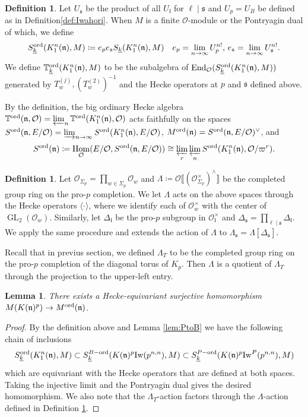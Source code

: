 \documentclass[leqno]{amsart}
\newtheorem{lem}[thm]{Lemma}
\theoremstyle{definition}
\newtheorem{defn}[thm]{Definition}
\theoremstyle{remark}
\newcommand{\oo}{\mathcal{O}}
\DeclareMathOperator{\End}{End}
\DeclareMathOperator{\Hom}{Hom}
\DeclareMathOperator{\GL}{GL}
\newcommand{\fs}{\mathfrak{s}}
\newcommand{\fn}{\mathfrak{n}}
\newcommand{\fl}{\mathfrak{l}}
\newcommand{\wt}[1]{\underline{ #1 }}
\newcommand{\Iw}{\textnormal{Iw}} %
\newcommand{\TT}{\mathbb{T}} %
\newcommand{\ord}{\textnormal{ord}} %
\begin{document}
\begin{defn}\label{def:ord_space_auxlevel}
Let $U_\fs$ be the product of all $  U_{\fl}$
for $\ell\mid \fs$ and $U_p=U_B$ be defined 
as in Definition\ref{def:Iwahori}.
When $M$ is a finite  $\oo$-module or the 
Pontryagin dual of which,
we define 
\[
	S_{\wt{k}}^{\ord}(K^n_1(\fn),M)\coloneqq
	e_pe_{\fs} S_{\wt{k}}(K^n_1(\fn),M)\quad
	e_p=\lim_{n\to \infty}U_p^{n!},\,
	e_\fs=\lim_{n\to \infty}U_\fs^{n!}.
\]
We define $\TT^{\ord}_{\wt{k}}(K^n_1(\fn),M)$
to be the subalgebra of 
$\End_{\oo}(S_{\wt{k}}^{\ord}(K^n_1(\fn),M))$
generated by $T_w^{(j)}, (T_{w}^{(2)})^{-1}$
and the Hecke operators at $p$ and  $\fs$ defined above.
\end{defn}
By the definition,
the big ordinary Hecke algebra
$\TT^{\ord}(\fn,\oo)=\varprojlim_n
\TT^{\ord}(K^n_1(\fn),\oo)$
acts faithfully on the spaces
$S^{\ord}(\fn,E/\oo)=\varinjlim_{n\to \infty}
S^{\ord}(K^n_1(\fn),E/\oo)$,
$M^{\ord}(\fn)=S^{\ord}(\fn,E/\oo)^\vee$, and
\begin{equation*}
	S^{\ord}(\fn)\coloneqq
	\Hom_\oo(E/\oo, S^{\ord}(\fn,E/\oo))
	\cong \varprojlim_r\varprojlim_n 
	S^{\ord}(K^n_1(\fn),\oo/\varpi^r).
\end{equation*}

\begin{defn}\label{def:lambda_rings}
Let $\oo_{\Sigma_p}=\prod_{w\in\Sigma_p}\oo_w$
and $\Lambda\coloneqq
\oo\llbracket(\oo_{\Sigma_p}^\times)^\wedge\rrbracket$
be the completed group ring on the pro-$p$ completion.
We let $\Lambda$ acts on the above spaces
through the Hecke operators  $\langle\cdot\rangle$,
where we identify each of  $\oo_w^\times$
with the center of $\GL_2(\oo_w)$.
Similarly, let $\Delta_\fl$ be the 
pro-$p$ subgroup in $\oo_\fl^\times$
and $\Delta_{\fs}=\prod_{\ell\mid \fs}\Delta_{\fl}$.
We apply the same procedure 
and extends the action of $\Lambda$
to $\Lambda_{\fs}=\Lambda[\Delta_{\fs}]$.
\end{defn}

Recall that in previus section,
we defined $\Lambda_T$
to be the completed group ring 
on the pro-$p$ completion of 
the diagonal torus of $K_p$.
Then $\Lambda$ is a quotient of  $\Lambda_T$
through the projection to the upper-left entry.
\begin{lem}\label{lem:coh_to_ord}
	There exists a Hecke-equivariant
	surjective homomorphism 
	$M(K(\fn)^p)\to M^{\ord}(\fn)$. 
\end{lem}
\begin{proof}
By the definition above and Lemma \ref{lem:PtoB}
we have the following chain of 
inclusions
\[
	S_{\wt{k}}^{\ord}(K^n_1(\fn),M)\subset
	S_{\wt{k}}^{B-\ord}(K(\fn)^p\Iw(p^{n,n}),M)\subset
	S_{\wt{k}}^{P-\ord}(K(\fn)^p\Iw^P(p^{n,n}),M)
\]
which are equivariant with the Hecke operators
that are defined at both spaces.
Taking the injective limit and the Pontryagin dual 
gives the desired homomorphism.
We also note that the $\Lambda_T$-action
factors through  the $\Lambda$-action defined in
Definition \ref{def:lambda_rings}.
\end{proof}
\end{document}
